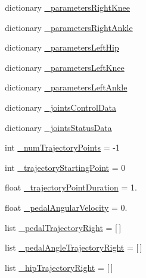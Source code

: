 \begin{DoxyCompactItemize}
\item 
dictionary \mbox{\hyperlink{namespacepedal__simulation__interpolation_ad8058e79e1045b76a24ddb0917f2ceb1}{\+\_\+parameters\+Right\+Knee}}
\item 
dictionary \mbox{\hyperlink{namespacepedal__simulation__interpolation_ac3edeafba54c9dc56151b3bc5b1a44d2}{\+\_\+parameters\+Right\+Ankle}}
\item 
dictionary \mbox{\hyperlink{namespacepedal__simulation__interpolation_ab4e82beda0ef155e345746bd535c6107}{\+\_\+parameters\+Left\+Hip}}
\item 
dictionary \mbox{\hyperlink{namespacepedal__simulation__interpolation_ab7cf8aad73bf3cc3e84e056a5ac0d2c8}{\+\_\+parameters\+Left\+Knee}}
\item 
dictionary \mbox{\hyperlink{namespacepedal__simulation__interpolation_aedc28e5c44908ab88be59a5e41fd72d1}{\+\_\+parameters\+Left\+Ankle}}
\item 
dictionary \mbox{\hyperlink{namespacepedal__simulation__interpolation_a347a244acdef3fc1225b8fa71ab2b53e}{\+\_\+joints\+Control\+Data}}
\item 
dictionary \mbox{\hyperlink{namespacepedal__simulation__interpolation_a81ba4a7602ba515dadcbd0f6ffc05784}{\+\_\+joints\+Status\+Data}}
\item 
int \mbox{\hyperlink{namespacepedal__simulation__interpolation_aa7605444a99f921a7f3edcad215abf19}{\+\_\+num\+Trajectory\+Points}} = -\/1
\item 
int \mbox{\hyperlink{namespacepedal__simulation__interpolation_a9058df63093039455b0a20ac038d8340}{\+\_\+trajectory\+Starting\+Point}} = 0
\item 
float \mbox{\hyperlink{namespacepedal__simulation__interpolation_a206342181ae2e9d4c26e1f4779561999}{\+\_\+trajectory\+Point\+Duration}} = 1.
\item 
float \mbox{\hyperlink{namespacepedal__simulation__interpolation_a0e686012b7f58ac4439fa4d291743d96}{\+\_\+pedal\+Angular\+Velocity}} = 0.
\item 
list \mbox{\hyperlink{namespacepedal__simulation__interpolation_a5a72df22864e541a6e88a0b31aac28f0}{\+\_\+pedal\+Trajectory\+Right}} = \mbox{[}$\,$\mbox{]}
\item 
list \mbox{\hyperlink{namespacepedal__simulation__interpolation_a533e79b2c13f6763517129cd822b79e1}{\+\_\+pedal\+Angle\+Trajectory\+Right}} = \mbox{[}$\,$\mbox{]}
\item 
list \mbox{\hyperlink{namespacepedal__simulation__interpolation_acf43d692f7f61ac77d23406c99045679}{\+\_\+hip\+Trajectory\+Right}} = \mbox{[}$\,$\mbox{]}

\end{DoxyCompactItemize}
